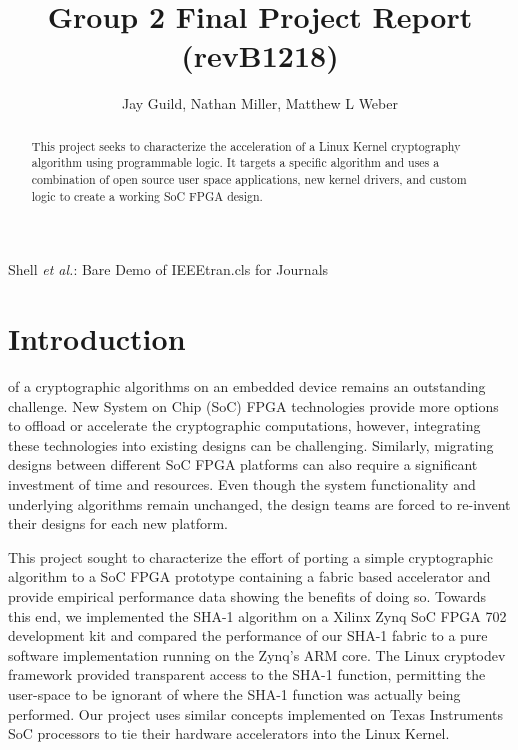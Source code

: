 \documentclass[journal]{IEEEtran}
\begin{document}
\title{Group 2 Final Project Report (revB1218)}
\author{Jay Guild, Nathan Miller, Matthew L Weber}

%
{Shell \MakeLowercase{\textit{et al.}}: Bare Demo of IEEEtran.cls for Journals}
% 

\maketitle

\begin{abstract}
This project seeks to characterize the acceleration of a Linux Kernel cryptography algorithm using programmable logic. It targets a specific algorithm and uses a combination of open source user space applications, new kernel drivers, and custom logic to create a working SoC FPGA design.
\end{abstract}


\IEEEpeerreviewmaketitle

\section{Introduction}
 of a cryptographic algorithms on an embedded device remains an outstanding challenge. New System on Chip (SoC) FPGA technologies provide more options to offload or accelerate the cryptographic computations, however, integrating these technologies into existing designs can be challenging. Similarly, migrating designs between different SoC FPGA platforms can also require a significant investment of time and resources. Even though the system functionality and underlying algorithms remain unchanged, the design teams are forced to re-invent their designs for each new platform.

This project sought to characterize the effort of porting a simple cryptographic algorithm to a SoC FPGA prototype containing a fabric based accelerator and provide empirical performance data showing the benefits of doing so. Towards this end, we implemented the SHA-1 algorithm on a Xilinx Zynq SoC FPGA 702 development kit and compared the performance of our SHA-1 fabric to a pure software implementation running on the Zynq’s ARM core.  The Linux cryptodev framework provided transparent access to the SHA-1 function, permitting the user-space to be ignorant of where the SHA-1 function was actually being performed.   Our project uses similar concepts implemented on Texas Instruments SoC processors to tie their hardware accelerators into the Linux Kernel.
\end{document}
